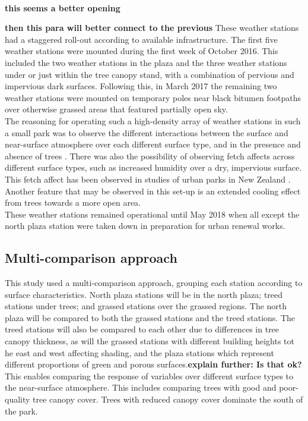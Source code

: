 \documentclass[twocolumn, a4paper]{article}
\providecommand{\comment}[1]{{\large\bf #1}}
\begin{document}
\\\comment{this seems a better opening}

\comment{then this para will better connect to the previous} These weather stations had a staggered roll-out according to available infrastructure. The first five weather stations were mounted during the first week of October 2016. This included the two weather stations in the plaza \citep{RN2032} and the three weather stations under or just within the tree canopy stand, with a combination of pervious and impervious dark surfaces. Following this, in March 2017 the remaining two weather stations were mounted on temporary poles near black bitumen footpaths over otherwise grassed areas that featured partially open sky.
\\
The reasoning for operating such a high-density array of weather stations in such a small park was to observe the different interactions between the surface and near-surface atmosphere over each different surface type, and in the presence and absence of trees \cite{RN1695} \cite{RN1706}. There was also the possibility of observing fetch affects across different surface types, such as increased humidity over a dry, impervious surface. 
\\
This fetch affect has been observed in studies of urban parks in New Zealand \cite{RN710}. Another feature that may be observed in this set-up is an extended cooling effect from trees towards a more open area.
\\
These weather stations remained operational until May 2018 when all except the north plaza station were taken down in preparation for urban renewal works.
\subsection{Multi-comparison approach}
This study used a multi-comparison approach, grouping each station according to surface characteristics. North plaza stations will be in the north plaza; treed stations under trees; and grassed stations over the grassed regions. The north plaza will be compared to both the grassed stations and the treed stations. The treed stations will also be compared to each other due to differences in tree canopy thickness, as will the grassed stations with different building heights tot he east and west affecting shading, and the plaza stations which represent different proportions of green and porous surfaces.\comment{explain further: Is that ok?} This enables comparing the response of variables over different surface types to the near-surface atmosphere. This includes comparing trees with good and poor-quality tree canopy cover. Trees with reduced canopy cover dominate the south of the park.
\\
\end{document}
